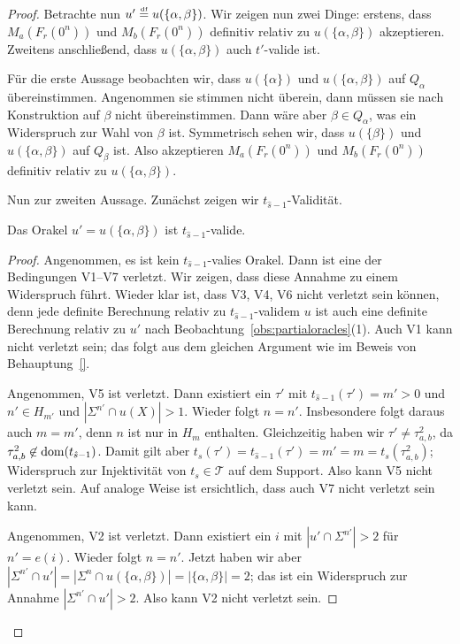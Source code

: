 \begin{proof}
Betrachte nun $u'\stackrel{\text{\smash{\tiny df}}}{=} u(\{\alpha, \beta\})$. Wir zeigen nun zwei Dinge: erstens, dass $M_a(F_r(0^n))$ und $M_b(F_r(0^n))$ definitiv relativ zu $u(\{\alpha, \beta\})$ akzeptieren.
Zweitens anschließend, dass $u(\{\alpha,\beta\})$ auch $t'$-valide ist.

Für die erste Aussage beobachten wir, dass $u(\{\alpha\})$ und $u(\{\alpha, \beta\})$ auf $Q_\alpha$ übereinstimmen. Angenommen sie stimmen nicht überein, dann müssen sie nach Konstruktion auf $\beta$ nicht übereinstimmen. Dann wäre aber $\beta\in Q_\alpha$, was ein Widerspruch zur Wahl von $\beta$ ist.
Symmetrisch sehen wir, dass $u(\{\beta\})$ und $u(\{\alpha, \beta\})$ auf $Q_\beta$ ist.
Also akzeptieren $M_a(F_r(0^n))$ und $M_b(F_r(0^n))$ definitiv relativ zu $u(\{\alpha, \beta\})$.

Nun zur zweiten Aussage. Zunächst zeigen wir $t_{\hat{s}-1}$-Validität.
\begin{claim}
    Das Orakel $u'=u(\{\alpha, \beta\})$ ist $t_{\hat{s}-1}$-valide.
\end{claim}
\begin{proof}
    Angenommen, es ist kein $t_{\hat{s}-1}$-valies Orakel. Dann ist eine der Bedingungen V1--V7 verletzt. Wir zeigen, dass diese Annahme zu einem Widerspruch führt.
    Wieder klar ist, dass V3, V4, V6 nicht verletzt sein können, denn jede definite Berechnung relativ zu $t_{\hat{s}-1}$-validem $u$ ist auch eine definite Berechnung relativ zu $u'$ nach Beobachtung~\ref{obs:partialoracles}(1).
    Auch V1 kann nicht verletzt sein; das folgt aus dem gleichen Argument wie im Beweis von Behauptung~\ref{}.

    Angenommen, V5 ist verletzt. Dann existiert ein $\tau'$ mit $t_{\hat{s}-1}(\tau')=m'>0$ und $n'\in H_{m'}$ und $|\Sigma^{n'}\cap u(X)|>1$. 
    Wieder folgt $n=n'$.
    Insbesondere folgt daraus auch $m=m'$, denn $n$ ist nur in $H_m$ enthalten.
    Gleichzeitig haben wir $\tau'\neq \tau^2_{a,b}$, da $\tau^2_{a,b}\not\in\operatorname{dom}(t_{\hat{s}-1})$.
    Damit gilt aber $t_s(\tau')=t_{\hat{s}-1}(\tau')=m'=m=t_s(\tau^2_{a,b})$; Widerspruch zur Injektivität von $t_s\in\mathcal T$ auf dem Support.
    Also kann V5 nicht verletzt sein. 
    Auf analoge Weise ist ersichtlich, dass auch V7 nicht verletzt sein kann.

    Angenommen, V2 ist verletzt. Dann existiert ein $i$ mit $|u'\cap\Sigma^{n'}|>2$ für $n'=e(i)$.
    Wieder folgt $n=n'$.
    Jetzt haben wir aber $|\Sigma^{n'}\cap u'|=|\Sigma^n\cap u(\{\alpha, \beta\})| = |\{\alpha,\beta\}|=2$; das ist ein Widerspruch zur Annahme $|\Sigma^{n'}\cap u'|>2$. Also kann V2 nicht verletzt sein. 


\end{proof}
\end{proof}
